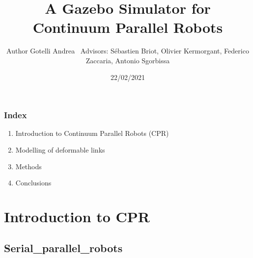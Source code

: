 \documentclass[compress]{thesisbeamer}
\title{A Gazebo Simulator for Continuum Parallel Robots}
\author[Gotelli Andrea]{Author Gotelli Andrea\newline ~ \newline \normalsize{Advisors: Sébastien Briot, Olivier Kermorgant, Federico Zaccaria, Antonio Sgorbissa}}
\date{22/02/2021}
\begin{document}
\MakeTitleNoFoot

\begin{frame}
	\frametitle{Index}
	\begin{enumerate}
		\item Introduction to Continuum Parallel Robots (CPR)
   		\item Modelling of deformable links
   		\item Methods
   		\item Conclusions
	\end{enumerate}	
\end{frame}

    
   	\section{Introduction to CPR}	
        \subsection{Serial_parallel_robots}
\end{document}
